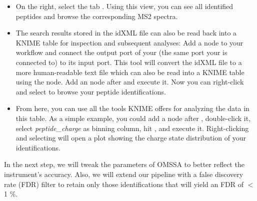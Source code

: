 \begin{itemize}
\item On the right, select the tab . Using this view, you can see all identified peptides and browse the corresponding MS2 spectra.
\item The search results stored in the idXML file can also be read back into a KNIME table for inspection and subsequent analyses: Add a   node to your workflow and connect the output port of your  (the same port your  is connected to) to its input port. This tool will convert the idXML file to a more human-readable text file which can also be read into a KNIME table using the  node. Add an  node  after  and execute it. Now you can right-click  and select  to browse your peptide identifications.
\item From here, you can use all the tools KNIME offers for analyzing the data in this table. As a simple example, you could add a   node after , double-click it, select \textit{peptide\_charge} as binning column, hit , and execute it. Right-clicking and selecting  will open a plot showing the charge state distribution of your identifications.
\end{itemize}

In the next step, we will tweak the parameters of OMSSA to better reflect the instrument's accuracy. Also, we will extend our pipeline with a false discovery rate (FDR) filter to retain only those identifications that will yield an FDR of $<$ 1 \%.


